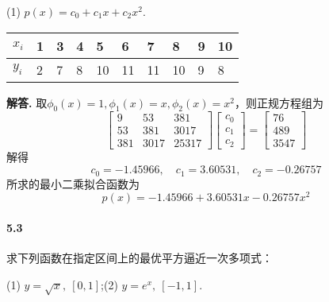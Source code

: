 \documentclass[12pt, a4paper, oneside]{ctexart}
\newenvironment{solution}{\par\noindent\textbf{解答. }}{\bigskip\par}
\begin{document}
(1) $p(x) = c_0+c_1x+c_2x^2$.
\renewcommand\arraystretch{0.6} %
\begin{table}[!htbp] %
    \centering %
    \begin{tabular}{p{1cm}<{\centering}p{1cm}<{\centering}p{1cm}<{\centering}p{1cm}<{\centering}p{1cm}<{\centering}p{1cm}<{\centering}p{1cm}<{\centering}p{1cm}<{\centering}p{1cm}<{\centering}p{1cm}<{\centering}} %
        \toprule
        $x_i$&1&3&4&5&6&7&8&9&10\\
        \midrule
        $y_i$&2&7&8&10&11&11&10&9&8\\
        \bottomrule
    \end{tabular}
\end{table}
\begin{solution}
    取$\phi_0(x) = 1, \phi_1(x) = x,\phi_2(x) = x^2$，则正规方程组为
    \begin{equation*}
        \left[\begin{matrix}
            9&53&381\\53&381&3017\\381&3017&25317
        \end{matrix}\right]
        \left[\begin{matrix}
            c_0\\c_1\\c_2
        \end{matrix}\right]=\left[\begin{matrix}
            76\\489\\3547
        \end{matrix}\right]
    \end{equation*}
    解得
    \begin{equation*}
        c_0 = -1.45966,\quad c_1 = 3.60531,\quad c_2 = -0.26757
    \end{equation*}
    所求的最小二乘拟合函数为
    \begin{equation*}
        p(x) = -1.45966+3.60531x-0.26757x^2
    \end{equation*}
\end{solution}
\paragraph{5.3}求下列函数在指定区间上的最优平方逼近一次多项式：

(1) $y=\sqrt{x},\ [0,1]$;\quad (2) $y=e^x,\ [-1,1]$.
\end{document}
